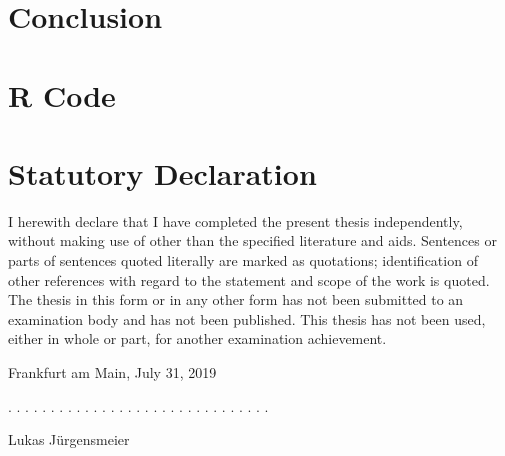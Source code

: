\documentclass[12pt,a4paper]{article}
\begin{document}
\section{Conclusion}




\clearpage
\appendix
\section{R Code}

\clearpage


\newpage
\thispagestyle{empty}
\section*{Statutory Declaration}\label{statutory-declaration}

I herewith declare that I have completed the present thesis independently, without making use of
other than the specified literature and aids. Sentences or parts of sentences quoted literally are
marked as quotations; identification of other references with regard to the statement and scope of
the work is quoted. The thesis in this form or in any other form has not been submitted to an examination body and has not been published.
This thesis has not been used, either in whole or part, for another examination achievement.

\vspace{1cm}

Frankfurt am Main, July 31, 2019
\vspace{2cm}

. . . . . . . . . . . . . . . . . . . . . . . . . . . . . . .
\vspace{0.1cm}

Lukas J\"urgensmeier
\end{document}
